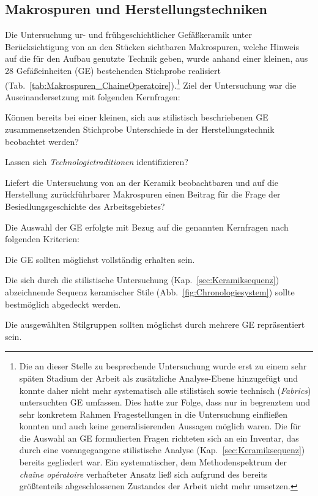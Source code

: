 \begin{multicols}{2}
\section{Makrospuren und Herstellungstechniken}\label{sec:Herstellung2_Toepferei}

Die Untersuchung ur- und frühgeschichtlicher Gefäßkeramik unter Berücksichtigung von an den Stücken sichtbaren Makrospuren, welche Hinweis auf die für den Aufbau genutzte Technik geben, wurde anhand einer kleinen, aus 28 Gefäßeinheiten (GE) bestehenden Stichprobe realisiert (Tab.~\ref{tab:Makrospuren_ChaineOperatoire}).\footnote{Die an dieser Stelle zu besprechende Untersuchung wurde erst zu einem sehr späten Stadium der Arbeit als zusätzliche Analyse-Ebene hinzugefügt und konnte daher nicht mehr systematisch alle stilistisch sowie technisch (\textit{Fabrics}) untersuchten GE umfassen. Dies hatte zur Folge, dass nur in begrenztem und sehr konkretem Rahmen Fragestellungen in die Untersuchung einfließen konnten und auch keine generalisierenden Aussagen möglich waren. Die für die Auswahl an GE formulierten Fragen richteten sich an ein Inventar, das durch eine vorangegangene stilistische Analyse (Kap.~\ref{sec:Keramiksequenz}) bereits gegliedert war. Ein systematischer, dem Methodenspektrum der \textit{\mbox{chaîne} opératoire} verhafteter Ansatz \parencite[siehe][25\,f.]{Ard.2014} ließ sich aufgrund des bereits größtenteils abgeschlossenen Zustandes der Arbeit nicht mehr umsetzen.} Ziel der Untersuchung war die Auseinandersetzung mit folgenden Kernfragen:
\begin{itemize*}
	\item Können bereits bei einer kleinen, sich aus stilistisch beschriebenen GE zusammensetzenden Stichprobe Unterschiede in der Herstellungstechnik beobachtet werden?
	\item Lassen sich \textit{Technologietraditionen} identifizieren?
	\item Liefert die Untersuchung von an der Keramik beobachtbaren und auf die Herstellung zurückführbarer Makrospuren einen Beitrag für die Frage der Besiedlungsgeschichte des Arbeitsgebietes?
\end{itemize*}

\noindent Die Auswahl der GE erfolgte mit Bezug auf die genannten Kernfragen nach folgenden Kriterien:
\begin{itemize*}
	\item Die GE sollten möglichst vollständig erhalten sein.
	\item Die sich durch die stilistische Untersuchung (Kap.~\ref{sec:Keramiksequenz}) abzeichnende Sequenz keramischer Stile (Abb.~\ref{fig:Chronologiesystem}) sollte bestmöglich abgedeckt werden.
	\item Die ausgewählten Stilgruppen sollten möglichst durch mehrere GE repräsentiert sein.
\end{itemize*}


\end{multicols}
